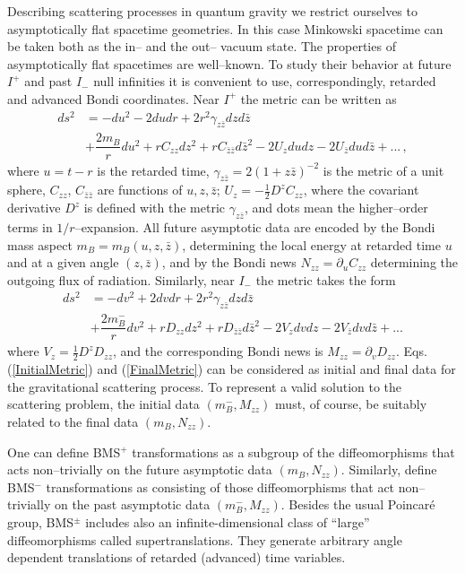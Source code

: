 \documentclass[11pt,a4paper]{article}
\newcommand{\be}{\begin{equation}}
\newcommand{\ee}{\end{equation}}
\begin{document}
Describing scattering processes in quantum gravity we restrict ourselves to asymptotically flat spacetime geometries.
In this case Minkowski spacetime can be taken both as the in-- and the out-- vacuum state. The properties of asymptotically flat spacetimes are well--known. To study their behavior at future $I^+$ and past $I_-$ null infinities it is convenient to use, correspondingly, retarded and advanced Bondi coordinates. Near $I^+$ the metric can be written as \cite{Wald:1984rg}
\be
\begin{split}\label{FinalMetric}
ds^2 & =-du^2-2dudr+2r^2\gamma_{z\bar{z}}dzd\bar{z}\nonumber \\
        & +\dfrac{2m_B}{r}du^2+rC_{zz}dz^2+rC_{\bar{z}\bar{z}}d\bar{z}^2-2U_zdudz-2U_{\bar{z}}dud\bar{z}+...\,,
\end{split}
\ee
where $u=t-r$ is the retarded time, $\gamma_{z\bar{z}}=2(1+z\bar{z})^{-2}$ is the metric of a unit sphere, $C_{zz}$, $C_{\bar{z}\bar{z}}$ are functions of $u,z,\bar{z}$; $U_z=-\frac{1}{2}D^zC_{zz}$, where the covariant derivative $D^z$ is defined with the metric $\gamma_{z\bar{z}}$, and dots mean the higher--order terms in $1/r$--expansion. All future asymptotic data are encoded by the Bondi mass aspect $m_B=m_B(u,z,\bar{z})$, determining the
local energy at retarded time $u$ and at a given angle $(z,\bar{z})$,
and by the Bondi news $N_{zz}=\partial_uC_{zz}$ determining the outgoing flux of radiation.
Similarly, near $I_-$ the metric takes the form
\be
\begin{split}\label{InitialMetric}
ds^2 & =-dv^2+2dvdr+2r^2\gamma_{z\bar{z}}dzd\bar{z}\nonumber \\
        & +\dfrac{2m_B^-}{r}dv^2+rD_{zz}dz^2+rD_{\bar{z}\bar{z}}d\bar{z}^2-2V_zdvdz-2V_{\bar{z}}dvd\bar{z}+...
\end{split}
\ee
where $V_z=\frac{1}{2}D^zD_{zz}$, and the corresponding Bondi news is $M_{zz}=\partial_vD_{zz}$. Eqs.(\ref{InitialMetric}) and (\ref{FinalMetric}) can be considered as initial and final data for the gravitational scattering process. To represent a valid solution to the scattering problem, the initial data $(m_B^-,M_{zz})$ must, of course, be suitably related to the final data $(m_B,N_{zz})$.

One can define BMS$^+$ transformations as a subgroup of the diffeomorphisms that acts non--trivially on the future asymptotic data $(m_B,N_{zz})$. Similarly, define BMS$^-$ transformations as consisting of those diffeomorphisms that act non--trivially on the past asymptotic data $(m_B^-,M_{zz})$.
Besides the usual Poincar\'e group, BMS$^{\pm}$ includes also an infinite-dimensional class of ``large'' diffeomorphisms called supertranslations. They generate arbitrary angle dependent translations of retarded (advanced) time variables.
\end{document}

